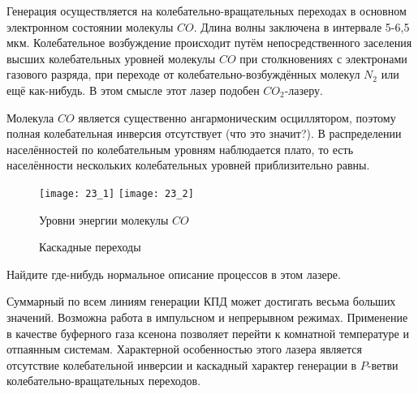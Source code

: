 Генерация осуществляется на колебательно-вращательных переходах в основном 
электронном состоянии молекулы \( CO \). Длина волны заключена в интервале 
5-6,5 мкм. Колебательное возбуждение происходит путём непосредственного 
заселения высших колебательных уровней молекулы \( CO \) при столкновениях с 
электронами газового разряда, при переходе от колебательно-возбуждённых 
молекул \( N_2 \) или ещё как-нибудь. В этом смысле этот лазер подобен 
\( CO_2 \)-лазеру.

Молекула \( CO \) является существенно ангармоническим осциллятором, поэтому 
полная колебательная инверсия отсутствует (что это значит?). В распределении 
населённостей по колебательным уровням наблюдается плато, то есть населённости 
нескольких колебательных уровней приблизительно равны.

\begin{figure}[h]
    \center
    \texttt{[image: 23\_1]}\hfill
    \texttt{[image: 23\_2]}
    \parbox[t]{.47\textwidth}{\caption{Уровни энергии молекулы \( CO \)}}\hfill
    \parbox[t]{.47\textwidth}{\caption{Каскадные переходы}}
\end{figure}

Найдите где-нибудь нормальное описание процессов в этом лазере.

Суммарный по всем линиям генерации КПД может достигать весьма больших 
значений. Возможна работа в импульсном и непрерывном режимах. Применение в 
качестве буферного газа ксенона позволяет перейти к комнатной температуре и 
отпаянным системам. Характерной особенностью этого лазера является отсутствие 
колебательной инверсии и каскадный характер генерации в \( P \)-ветви 
колебательно-вращательных переходов.